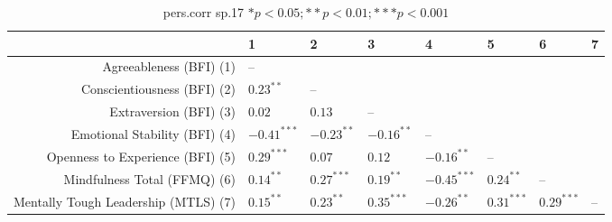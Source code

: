 \begin{table}[ht]
\centering
\begin{tabular}{rlllllll}
  \hline
 & 1 & 2 & 3 & 4 & 5 & 6 & 7 \\ 
  \hline
Agreeableness (BFI) (1) & -- &  &  &  &  &  &  \\ 
  Conscientiousness (BFI) (2) & $0.23^{**}$ & -- &  &  &  &  &  \\ 
  Extraversion (BFI) (3) & $0.02$ & $0.13$ & -- &  &  &  &  \\ 
  Emotional Stability (BFI) (4) & $-0.41^{***}$ & $-0.23^{**}$ & $-0.16^{**}$ & -- &  &  &  \\ 
  Openness to Experience (BFI) (5) & $0.29^{***}$ & $0.07$ & $0.12$ & $-0.16^{**}$ & -- &  &  \\ 
  Mindfulness Total (FFMQ) (6) & $0.14^{**}$ & $0.27^{***}$ & $0.19^{**}$ & $-0.45^{***}$ & $0.24^{**}$ & -- &  \\ 
  Mentally Tough Leadership (MTLS) (7) & $0.15^{**}$ & $0.23^{**}$ & $0.35^{***}$ & $-0.26^{**}$ & $0.31^{***}$ & $0.29^{***}$ & -- \\ 
   \hline
\end{tabular}
\caption{pers.corr sp.17 $* p < 0.05; ** p < 0.01; *** p < 0.001$} 
\label{freq_corr.pers.corr.sp.17}
\end{table}
